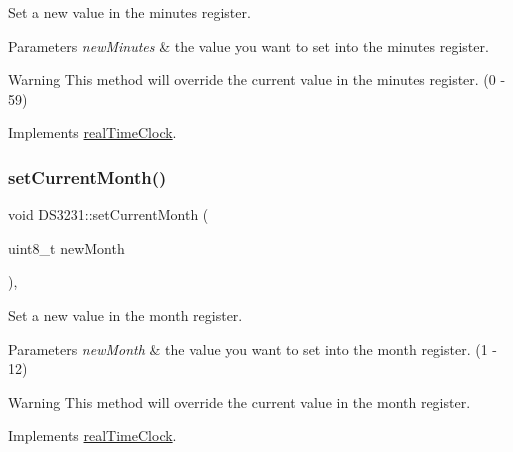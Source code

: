 Set a new value in the minutes register. 


\begin{DoxyParams}{Parameters}
{\em new\+Minutes} & the value you want to set into the minutes register. \\
\hline
\end{DoxyParams}
\begin{DoxyWarning}{Warning}
This method will override the current value in the minutes register. (0 -\/ 59) 
\end{DoxyWarning}


Implements \mbox{\hyperlink{classreal_time_clock_a52da7366cd5f1e4c270eb87e7298da42}{real\+Time\+Clock}}.

\mbox{\label{class_d_s3231_a122611bf693cdd538178b99b893a7115}} 
\subsubsection{\texorpdfstring{set\+Current\+Month()}{setCurrentMonth()}}
{\footnotesize\ttfamily void D\+S3231\+::set\+Current\+Month (\begin{DoxyParamCaption}\item[{uint8\+\_\+t}]{new\+Month }\end{DoxyParamCaption})\hspace{0.3cm}{\ttfamily [override]}, {\ttfamily [virtual]}}



Set a new value in the month register. 


\begin{DoxyParams}{Parameters}
{\em new\+Month} & the value you want to set into the month register. (1 -\/ 12) \\
\hline
\end{DoxyParams}
\begin{DoxyWarning}{Warning}
This method will override the current value in the month register. 
\end{DoxyWarning}


Implements \mbox{\hyperlink{classreal_time_clock_a2edeb084630a78309bc574eceaf5d6ae}{real\+Time\+Clock}}.

\mbox{\label{class_d_s3231_ac73512cc6c2a37ffb21bee74ea835a09}} 
